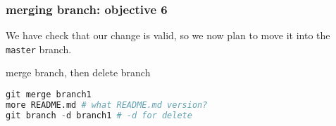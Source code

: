 \begin{frame}[containsverbatim]
\frametitle{ merging branch: objective 6}
\begin{exampleblock}{}
We have check that our change is valid, so we now plan to move it into the \verb|master| branch.
\end{exampleblock}
\begin{exampleblock}{merge branch, then delete branch}
\begin{lstlisting}[language=python]
git merge branch1
more README.md # what README.md version?
git branch -d branch1 # -d for delete
\end{lstlisting}
\end{exampleblock}
\end{frame}